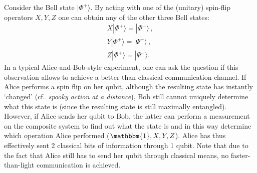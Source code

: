 
    \begin{method}
        Consider the Bell state $|\Phi^+\rangle$. By acting with one of the (unitary) spin-flip operators $X,Y,Z$ one can obtain any of the other three Bell states:
        \begin{gather}
            X|\Phi^+\rangle = |\Phi^-\rangle\,,\nonumber\\
            Y|\Phi^+\rangle = |\Psi^+\rangle\,,\\
            Z|\Phi^+\rangle = |\Psi^-\rangle.\nonumber
        \end{gather}
        In a typical Alice-and-Bob-style experiment, one can ask the question if this observation allows to achieve a better-than-classical communication channel. If Alice performs a spin flip on her qubit, although the resulting state has instantly `changed' (cf.~\textit{spooky action at a distance}), Bob still cannot uniquely determine what this state is (since the resulting state is still maximally entangled). However, if Alice sends her qubit to Bob, the latter can perform a measurement on the composite system to find out what the state is and in this way determine which operation Alice performed ($\mathbbm{1},X,Y,Z$). Alice has thus effectively sent 2 classical bits of information through 1 qubit. Note that due to the fact that Alice still has to send her qubit through classical means, no faster-than-light communication is achieved.
    \end{method}


